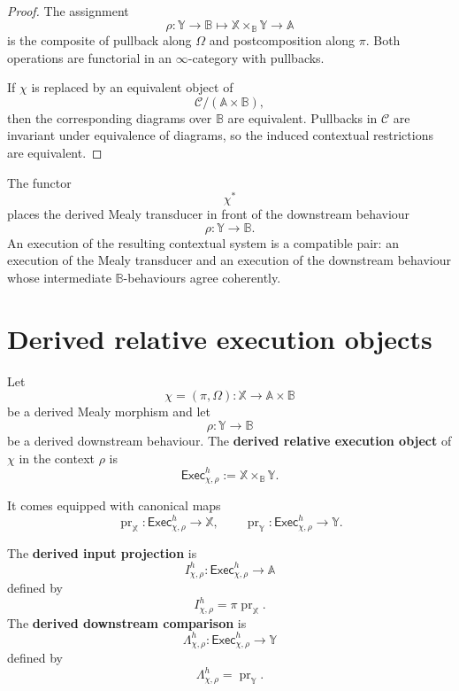 \begin{proof}
The assignment
\[
\rho:\mathbb Y\to\mathbb B
\longmapsto
\mathbb X\times_{\mathbb B}\mathbb Y\to\mathbb A
\]
is the composite of pullback along \(\Omega\) and postcomposition along
\(\pi\). Both operations are functorial in an \(\infty\)-category with
pullbacks.

If \(\chi\) is replaced by an equivalent object of
\[
\mathcal C/(\mathbb A\times\mathbb B),
\]
then the corresponding diagrams over \(\mathbb B\) are equivalent. Pullbacks
in \(\mathcal C\) are invariant under equivalence of diagrams, so the induced
contextual restrictions are equivalent.
\end{proof}

\begin{remark}
\label{rem:contextual-restriction-operational-reading}
The functor
\[
\chi^\ast
\]
places the derived Mealy transducer in front of the downstream behaviour
\[
\rho:\mathbb Y\to\mathbb B.
\]
An execution of the resulting contextual system is a compatible pair:
an execution of the Mealy transducer and an execution of the downstream
behaviour whose intermediate \(\mathbb B\)-behaviours agree coherently.
\end{remark}

\section{Derived relative execution objects}
\label{sec:derived-relative-execution-objects}

\begin{definition}
\label{def:derived-relative-execution-object}
Let
\[
\chi=(\pi,\Omega):\mathbb X\to\mathbb A\times\mathbb B
\]
be a derived Mealy morphism and let
\[
\rho:\mathbb Y\to\mathbb B
\]
be a derived downstream behaviour. The \textbf{derived relative execution
object} of \(\chi\) in the context \(\rho\) is
\[
\mathsf{Exec}^h_{\chi,\rho}
:=
\mathbb X\times_{\mathbb B}\mathbb Y.
\]
\end{definition}

It comes equipped with canonical maps
\[
\operatorname{pr}_{\mathbb X}:
\mathsf{Exec}^h_{\chi,\rho}\to\mathbb X,
\qquad
\operatorname{pr}_{\mathbb Y}:
\mathsf{Exec}^h_{\chi,\rho}\to\mathbb Y.
\]

\begin{definition}
\label{def:derived-input-downstream-projections}
The \textbf{derived input projection} is
\[
I^h_{\chi,\rho}:
\mathsf{Exec}^h_{\chi,\rho}
\to
\mathbb A
\]
defined by
\[
I^h_{\chi,\rho}
=
\pi\operatorname{pr}_{\mathbb X}.
\]
The \textbf{derived downstream comparison} is
\[
\Lambda^h_{\chi,\rho}:
\mathsf{Exec}^h_{\chi,\rho}
\to
\mathbb Y
\]
defined by
\[
\Lambda^h_{\chi,\rho}
=
\operatorname{pr}_{\mathbb Y}.
\]
\end{definition}

